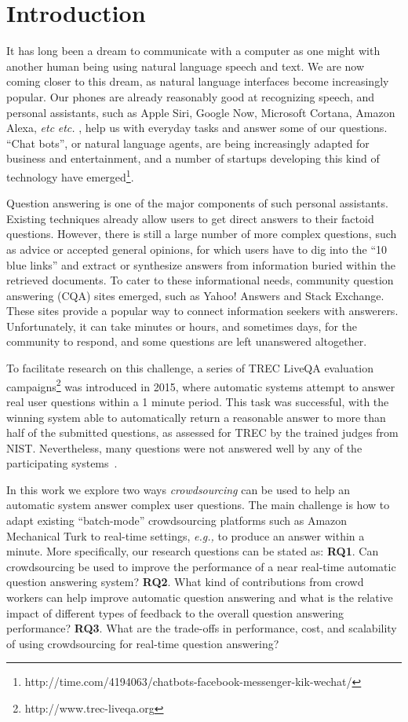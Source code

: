 \documentclass[letterpaper]{article}
\makeatletter
\newcommand{\eg}{\textit{e.g.,}\@\xspace}
\newcommand{\etc}{%
    \@ifnextchar{.}%
        {\textit{etc}}%
        {\textit{etc.}\@\xspace}%
}
\makeatother
\begin{document}
\section{Introduction}
\label{sec:introduction}

It has long been a dream to communicate with a computer as one might with another human being using natural language speech and text.
We are now coming closer to this dream, as natural language interfaces become increasingly popular.
Our phones are already reasonably good at recognizing speech, and personal assistants, such as Apple Siri, Google Now, Microsoft Cortana, Amazon Alexa, \etc, help us with everyday tasks and answer some of our questions.
``Chat bots'', or natural language agents, are being increasingly adapted for business and entertainment, and a number of startups developing this kind of technology have emerged\footnote{http://time.com/4194063/chatbots-facebook-messenger-kik-wechat/}.

Question answering is one of the major components of such personal assistants.
Existing techniques already allow users to get direct answers to their factoid questions.
However, there is still a large number of more complex questions, such as advice or accepted general opinions, for which users have to dig into the ``10 blue links'' and extract or synthesize answers from information buried within the retrieved documents.
To cater to these informational needs, community question answering (CQA) sites emerged, such as Yahoo! Answers and Stack Exchange.
These sites provide a popular way to connect information seekers with answerers.
Unfortunately, it can take minutes or hours, and sometimes days, for the community to respond, and some questions are left unanswered altogether. 

To facilitate research on this challenge, a series of TREC LiveQA evaluation campaigns\footnote{http://www.trec-liveqa.org} was introduced in 2015, where automatic systems attempt to answer real user questions within a 1 minute period.
This task was successful, with the winning system able to automatically return a reasonable answer to more than half of the submitted questions, as assessed for TREC by the trained judges from NIST.
Nevertheless, many questions were not answered well by any of the participating systems~\cite{overviewliveqa15}.

In this work we explore two ways \textit{crowdsourcing} can be used to help an automatic system answer complex user questions.
The main challenge is how to adapt existing ``batch-mode'' crowdsourcing platforms such as Amazon Mechanical Turk to real-time settings, \eg to produce an answer within a minute.
More specifically, our research questions can be stated as:
\textbf{RQ1}. Can crowdsourcing be used to improve the performance of a near real-time automatic question answering system?
\textbf{RQ2}. What kind of contributions from crowd workers can help improve automatic question answering and what is the relative impact of different types of feedback to the overall question answering performance?
\textbf{RQ3}. What are the trade-offs in performance, cost, and scalability of using crowdsourcing for real-time question answering?
\end{document}
